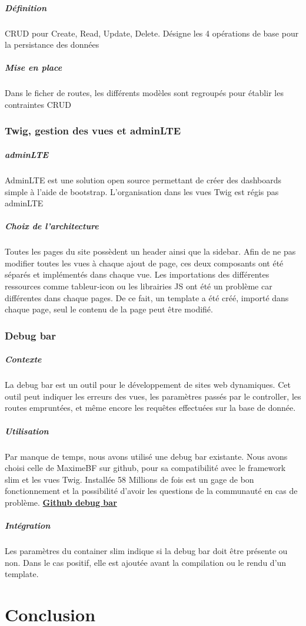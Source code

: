\documentclass[french,12pt,a4paper,titlepage]{report}
\begin{document}
	\paragraph{Définition} CRUD pour Create, Read, Update, Delete. Désigne les 4 opérations de base pour la persistance des données
	\paragraph{Mise en place} Dans le ficher de routes, les différents modèles sont regroupés pour établir les contraintes CRUD
	\subsection{Twig, gestion des vues et adminLTE}
	\paragraph{adminLTE} AdminLTE est une solution open source permettant de créer des dashboards simple à l'aide de bootstrap. L'organisation dans les vues Twig est régis pas adminLTE
	\paragraph{Choix de l'architecture} Toutes les pages du site possèdent un header ainsi que la sidebar. \newline 
	Afin de ne pas modifier toutes les vues à chaque ajout de page, ces deux composants ont été séparés et implémentés dans chaque vue.
	\newline
	Les importations des différentes ressources comme tableur-icon ou les librairies JS ont été un problème car différentes dans chaque pages. De ce fait, un template a été créé, importé dans chaque page, seul le contenu de la page peut être modifié. 
	\subsection{Debug bar}
	\paragraph{Contexte}
	La debug bar est un outil pour le développement de sites web dynamiques. Cet outil peut indiquer les erreurs des vues, les paramètres passés par le controller, les routes empruntées, et même encore les requêtes effectuées sur la base de donnée.
	\paragraph{Utilisation}
	Par manque de temps, nous avons utilisé une debug bar existante. Nous avons choisi celle de MaximeBF sur github, pour sa compatibilité avec le framework slim et les vues Twig. Installée 58 Millions de fois est un gage de bon fonctionnement et la possibilité d'avoir les questions de la communauté en cas de problème.
	\newline
	\textbf{\href{https://github.com/maximebf/php-debugbar}{Github debug bar}}
	\paragraph{Intégration}
	Les paramètres du container slim indique si la debug bar doit être présente ou non. Dans le cas positif, elle est ajoutée avant la compilation ou le rendu d'un template.
	\chapter{Conclusion}
	\listoffigures
	\listoftables
\end{document}
